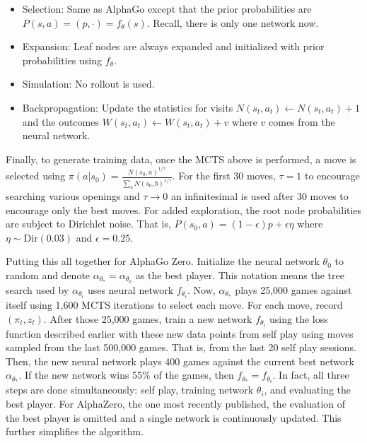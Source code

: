 \documentclass{article}
\begin{document}
  \begin{itemize}
    \item Selection: Same as AlphaGo except that the prior probabilities are \\ $P(s,a) = (p,\cdot) = f_{\theta}(s)$. Recall, there is only one network now.

    \item Expansion: Leaf nodes are always expanded and initialized with prior probabilities using $f_{\theta}$.

    \item Simulation: No rollout is used.

    \item Backpropagation: Update the statistics for visits $N(s_t,a_t) \leftarrow N(s_t,a_t) +1$ and the outcomes $W(s_t,a_t) \leftarrow W(s_t, a_t) + v$ where $v$ comes from the neural network.

  \end{itemize}

  Finally, to generate training data, once the MCTS above is performed, a move is selected using $\pi(a | s_0) = \frac{N(s_0, a)^{1/\tau}}{\sum_b N(s_0, b)^{1/\tau}}$. For the first 30 moves, $\tau = 1$ to encourage searching various openings and $\tau \rightarrow 0$ an infinitesimal is used after 30 moves to encourage only the best moves. For added exploration, the root node probabilities are subject to Dirichlet noise. That is, $P(s_0, a) = (1-\epsilon) p + \epsilon \eta$ where $\eta \sim \text{Dir}(0.03)$ and $\epsilon = 0.25$.

  Putting this all together for AlphaGo Zero. Initialize the neural network $\theta_0$ to random and denote $\alpha_{\theta_*} = \alpha_{\theta_0}$ as the best player. This notation means the tree search used by $\alpha_{\theta_i}$ uses neural network $f_{\theta_i}$. Now, $\alpha_{\theta_*}$ plays 25,000 games against itself using 1,600 MCTS iterations to select each move. For each move, record $(\pi_t, z_t)$. After those 25,000 games, train a new network $f_{\theta_{i}}$ using the loss function described earlier with these new data points from self play using moves sampled from the last 500,000 games. That is, from the last 20 self play sessions. Then, the new neural network plays 400 games against the current best network $\alpha_{\theta_*}$. If the new network wins 55\% of the games, then $f_{\theta_*} = f_{\theta_i}$. In fact, all three steps are done simultaneously: self play, training network $\theta_i$, and evaluating the best player. For AlphaZero, the one most recently published, the evaluation of the best player is omitted and a single network is continuously updated. This further simplifies the algorithm.
\end{document}
